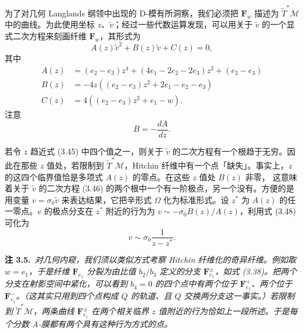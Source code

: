为了对几何 Langlands 纲领中出现的 D-模有所洞察，我们必须把 $\boldsymbol{F}_w$ 描述为 $\tilde{T}^*\mathcal{M}$ 中的曲线。为此使用坐标 $z$、$\tilde v$；经过一些代数运算发现，可以用关于 $\tilde v$ 的一个显式二次方程来刻画纤维 $\boldsymbol{F}_w$，其形式为
\begin{equation}\tag{3.46}
A(z)\tilde v^2+B(z)\tilde v+C(z)=0,
\end{equation}
其中
\begin{equation}\tag{3.47}
\begin{aligned}
A(z)&=(e_2-e_3)z^4+(4e_1-2e_2-2e_3)z^2+(e_2-e_3)\\
B(z)&=-4z((e_2-e_3)z^2+2e_1-e_2-e_3)\\
C(z)&=4((e_2-e_3)z^2+e_1-w).
\end{aligned}
\end{equation}
注意
\begin{equation}\tag{3.48}
B=-\frac{dA}{dz}.
\end{equation}

若令 $z$ 趋近式 (3.45) 中四个值之一，则关于 $\tilde v$ 的二次方程有一个根趋于无穷。因此在那些 $z$ 值处，若限制到 $\tilde{T}^*\mathcal{M}$，Hitchin 纤维中有一个点「缺失」。事实上，$z$ 的这四个临界值恰是多项式 $A(z)$ 的零点。在这些 $z$ 值处 $B(z)$ 非零，
这意味着关于 $\tilde v$ 的二次方程 (3.46) 的两个根中一个有一阶极点，另一个没有。方便的是用变量 $v=\sigma_0\tilde v$ 来表达结果，它把辛形式 $\Omega$ 化为标准形式。设 $z^*$ 为 $A(z)$ 的任一零点。$v$ 的极点分支在 $z^*$ 附近的行为为 $v\sim-\sigma_0B(z)/A(z)$，利用式 (3.48) 可化为
\begin{equation}\tag{3.49}
v\sim\sigma_0\frac{1}{z-z^*}.
\end{equation}

\par\medskip
\noindent\textbf{注 3.5.}\ \textit{对几何内窥，我们须以类似方式考察 Hitchin 纤维化的奇异纤维。例如取 $w=e_1$，于是纤维 $\boldsymbol{F}_{e_1}$ 分裂为由比值 $b_2/b_3$ 定义的分支 $\boldsymbol{F}^\pm_{e_1}$，如式 (3.38)。把两个分支在射影空间中紧化，可以看到 $b_4=0$ 的四个点中有两个位于 $\boldsymbol{F}^+_{e_1}$、两个位于 $\boldsymbol{F}^-_{e_1}$。（这其实只用到四个点构成 $Q$ 的轨道、且 $Q$ 交换两分支这一事实。）若限制到 $\tilde{T}^*\mathcal{M}$，两条曲线 $\boldsymbol{F}^\pm_{e_1}$ 在两个相关临界 $z$ 值附近的行为恰如上一段所述。于是每个分数 A-膜都有两个具有这种行为方式的点。}
\par\medskip

